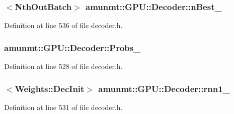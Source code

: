 \subsubsection[{\texorpdfstring{n\+Best\+\_\+}{nBest_}}]{$<${\bf Nth\+Out\+Batch}$>$ amunmt\+::\+G\+P\+U\+::\+Decoder\+::n\+Best\+\_\+\hspace{0.3cm}{\ttfamily [private]}}\hypertarget{classamunmt_1_1GPU_1_1Decoder_a2c9298f8ba8046fcca15ff07be843cef}{}\label{classamunmt_1_1GPU_1_1Decoder_a2c9298f8ba8046fcca15ff07be843cef}


Definition at line 536 of file decoder.\+h.

\subsubsection[{\texorpdfstring{Probs\+\_\+}{Probs_}}]{ amunmt\+::\+G\+P\+U\+::\+Decoder\+::\+Probs\+\_\+\hspace{0.3cm}{\ttfamily [private]}}\hypertarget{classamunmt_1_1GPU_1_1Decoder_a2db7ea96ac662e863cc42d7b2c3bd935}{}\label{classamunmt_1_1GPU_1_1Decoder_a2db7ea96ac662e863cc42d7b2c3bd935}


Definition at line 528 of file decoder.\+h.

\subsubsection[{\texorpdfstring{rnn1\+\_\+}{rnn1_}}]{$<${\bf Weights\+::\+Dec\+Init}$>$ amunmt\+::\+G\+P\+U\+::\+Decoder\+::rnn1\+\_\+\hspace{0.3cm}{\ttfamily [private]}}\hypertarget{classamunmt_1_1GPU_1_1Decoder_ad7956fe0c4c077a501e171dd104a14af}{}\label{classamunmt_1_1GPU_1_1Decoder_ad7956fe0c4c077a501e171dd104a14af}


Definition at line 531 of file decoder.\+h.

